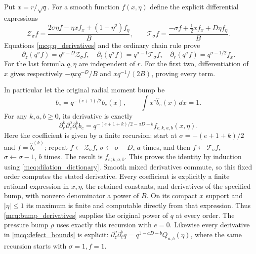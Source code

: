 \documentclass[11pt]{article}
\begin{document}
Put \(x=r/\sqrt q\). For a smooth function \(f(x,\eta)\) define the
explicit differential expressions
\[
 \mathcal Z_\sigma f=
 \frac{2\sigma\eta f-\eta x f_x+(1-\eta^2)f_\eta}{B},\qquad
 \mathcal T_\sigma f=
 \frac{-\sigma f+\frac12x f_x+D\eta f_\eta}{B}.
\]
Equations \eqref{mcq:q_derivatives} and the ordinary chain rule prove
\begin{equation}\label{mcq:dilation_dictionary}
 \partial_z(q^\sigma f)=q^{\sigma-D}\mathcal Z_\sigma f,\quad
 \partial_t(q^\sigma f)=q^{\sigma-1}\mathcal T_\sigma f,\quad
 \partial_r(q^\sigma f)=q^{\sigma-1/2}f_x .
\end{equation}
For the last formula \(q,\eta\) are independent of \(r\).
For the first two, differentiation of \(x\) gives respectively
\(-\eta xq^{-D}/B\) and \(xq^{-1}/(2B)\), proving every term.

In particular let the original radial moment bump be
\[
 b_e=q^{-(e+1)/2}\widehat b_e(x),\qquad
 \int x^e\widehat b_e(x)\,dx=1 .
\]
For any \(k,a,b\ge0\), its derivative is exactly
\begin{equation}\label{mcq:bump_derivatives}
 \partial_r^k\partial_z^a\partial_t^b b_e
 =q^{-(e+1+k)/2-aD-b} f_{e;k,a,b}(x,\eta).
\end{equation}
Here the coefficient is given by a finite recursion: start at
\(\sigma=-(e+1+k)/2\) and \(f=\widehat b_e^{(k)}\);
repeat \(f\leftarrow\mathcal Z_\sigma f\),
\(\sigma\leftarrow\sigma-D\), \(a\) times, and then
\(f\leftarrow\mathcal T_\sigma f\),
\(\sigma\leftarrow\sigma-1\), \(b\) times.
The result is \(f_{e;k,a,b}\). This proves the identity by induction
using \eqref{mcq:dilation_dictionary}. Smooth mixed derivatives commute,
so this fixed order computes the stated derivative.
Every coefficient is explicitly a finite rational expression in \(x,\eta\),
the retained constants, and derivatives of the specified bump, with
nonzero denominator a power of \(B\). On its compact \(x\) support
and \(|\eta|\le1\) its maximum is finite and computable directly from
that expression. Thus \eqref{mcq:bump_derivatives} supplies the original
power of \(q\) at every order.
The pressure bump \(\rho\) uses exactly this recursion with \(e=0\).
Likewise every derivative in \eqref{mcq:defect_bounds} is explicit:
\(\partial_z^a\partial_t^bq=q^{1-aD-b}Q_{a,b}(\eta)\), where the same
recursion starts with \(\sigma=1,f=1\).
\end{document}
